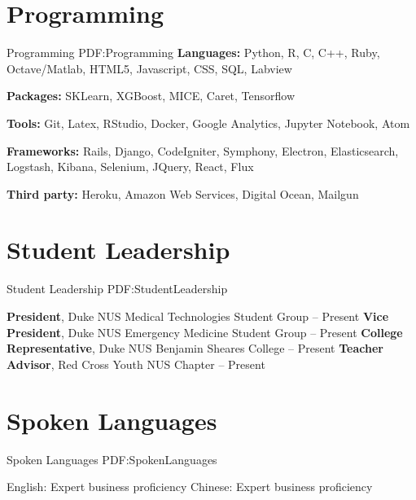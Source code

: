 \documentclass[letterpaper,10pt,oneside]{article}
\begin{document}
\begin{body}
\section
{Programming}
{Programming}
{PDF:Programming}
\textbf{Languages:} Python, R, C, C++, Ruby, Octave/Matlab, HTML5, Javascript, CSS, SQL, Labview
\GapNoBreak

\textbf{Packages:} SKLearn, XGBoost, MICE, Caret, Tensorflow

\textbf{Tools:} Git, Latex, RStudio, Docker, Google Analytics, Jupyter Notebook, Atom
\GapNoBreak

\textbf{Frameworks:} Rails, Django, CodeIgniter, Symphony, Electron, Elasticsearch, Logstash, Kibana, Selenium, JQuery, React, Flux
\GapNoBreak

\textbf{Third party:} Heroku, Amazon Web Services, Digital Ocean, Mailgun
\GapNoBreak

\section
{Student Leadership}
{Student Leadership}
{PDF:StudentLeadership}

\textbf{President}, Duke NUS Medical Technologies Student Group
\hfill
{} -- Present
\GapNoBreak
\textbf{Vice President}, Duke NUS Emergency Medicine Student Group
\hfill
{} -- Present
\GapNoBreak
\textbf{College Representative}, Duke NUS Benjamin Sheares College
\hfill
{} -- Present
\GapNoBreak
\textbf{Teacher Advisor}, Red Cross Youth NUS Chapter
\hfill
{} -- Present

\section
{Spoken Languages}
{Spoken Languages}
{PDF:SpokenLanguages}

English: Expert business proficiency
\GapNoBreak
Chinese: Expert business proficiency

\end{body}


\label{LastPage}~
\end{document}
